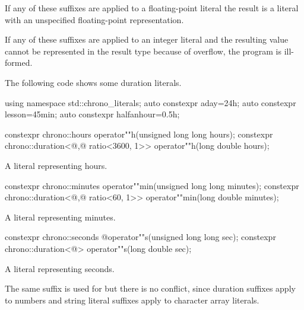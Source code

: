 \pnum
If any of these suffixes are applied to a floating-point literal the result is a
 literal with an unspecified floating-point representation.

\pnum
If any of these suffixes are applied to an integer literal and the resulting
 value cannot be represented in the result type because
of overflow, the program is ill-formed.

\pnum
\begin{example}
The following code shows some duration literals.
\begin{codeblock}
using namespace std::chrono_literals;
auto constexpr aday=24h;
auto constexpr lesson=45min;
auto constexpr halfanhour=0.5h;
\end{codeblock}
\end{example}

%
\begin{itemdecl}
constexpr chrono::hours                                 operator""h(unsigned long long hours);
constexpr chrono::duration<@\unspec,@ ratio<3600, 1>> operator""h(long double hours);
\end{itemdecl}

\begin{itemdescr}
\pnum
\returns
A  literal representing  hours.
\end{itemdescr}

%
\begin{itemdecl}
constexpr chrono::minutes                             operator""min(unsigned long long minutes);
constexpr chrono::duration<@\unspec,@ ratio<60, 1>> operator""min(long double minutes);
\end{itemdecl}

\begin{itemdescr}
\pnum
\returns
A  literal representing  minutes.
\end{itemdescr}

%
\begin{itemdecl}
constexpr chrono::seconds  @\itcorr@             operator""s(unsigned long long sec);
constexpr chrono::duration<@\unspec@> operator""s(long double sec);
\end{itemdecl}

\begin{itemdescr}
\pnum
\returns
A  literal representing  seconds.

\pnum
\begin{note}
The same suffix  is used for  but there is no
conflict, since duration suffixes apply to numbers and string literal suffixes
apply to character array literals.
\end{note}
\end{itemdescr}

